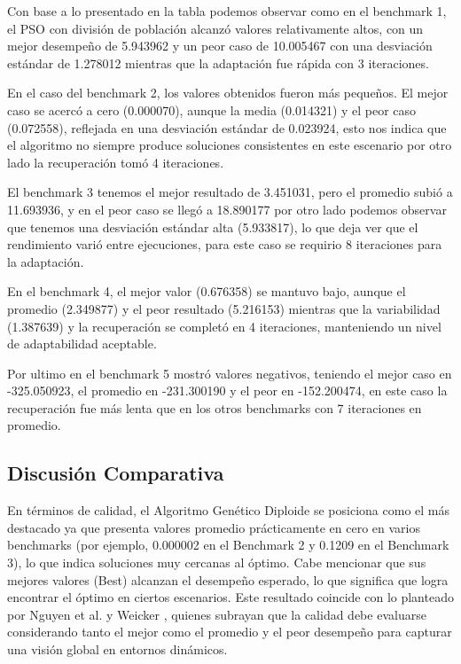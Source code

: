 \documentclass[10pt]{article}
\begin{document}
Con base a lo presentado en la tabla podemos observar como en el benchmark 1, el PSO con división de población alcanzó valores relativamente altos, con un mejor desempeño de 5.943962 y un peor caso de 10.005467 con una desviación estándar de 1.278012 mientras que la adaptación fue rápida con 3 iteraciones.

En el caso del benchmark 2, los valores obtenidos fueron más pequeños. El mejor caso se acercó a cero (0.000070), aunque la media (0.014321) y el peor caso (0.072558), reflejada en una desviación estándar de 0.023924, esto nos indica que el algoritmo no siempre produce soluciones consistentes en este escenario por otro lado la recuperación tomó 4 iteraciones.

El benchmark 3 tenemos el mejor resultado de 3.451031, pero el promedio subió a 11.693936, y en el peor caso se llegó a 18.890177 por otro lado podemos observar que tenemos una desviación estándar alta (5.933817), lo que deja ver que el rendimiento varió entre ejecuciones, para este caso se requirio 8 iteraciones para la adaptación.

En el benchmark 4, el mejor valor (0.676358) se mantuvo bajo, aunque el promedio (2.349877) y el peor resultado (5.216153) mientras que la variabilidad (1.387639) y la recuperación se completó en 4 iteraciones, manteniendo un nivel de adaptabilidad aceptable.

Por ultimo en el benchmark 5 mostró valores negativos, teniendo el mejor caso en -325.050923, el promedio en -231.300190 y el peor en -152.200474, en este caso la recuperación fue más lenta que en los otros benchmarks con 7 iteraciones en promedio.

\subsection*{Discusión Comparativa}

En términos de calidad, el Algoritmo Genético Diploide se posiciona como el más destacado ya que presenta valores promedio prácticamente en cero en varios benchmarks (por ejemplo, 0.000002 en el Benchmark 2 y 0.1209 en el Benchmark 3), lo que indica soluciones muy cercanas al óptimo. Cabe mencionar que sus mejores valores (Best) alcanzan el desempeño esperado, lo que significa que logra encontrar el óptimo en ciertos escenarios. Este resultado coincide con lo planteado por Nguyen et al. \cite{nguyen2012survey} y Weicker \cite{weicker2003performance}, quienes subrayan que la calidad debe evaluarse considerando tanto el mejor como el promedio y el peor desempeño para capturar una visión global en entornos dinámicos.
\end{document}
